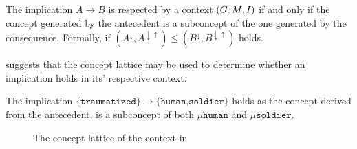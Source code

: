 \begin{proposition}
	\label{proposition:implication-concepts}

	The implication $A \rightarrow B$ is respected by a context $(G,M,\mathrel{I})$ if and only if the concept generated by the
	antecedent is a subconcept of the one generated by the consequence. Formally, if
	$(A^{\downarrow}, A^{\downarrow \uparrow}) \leq (B^{\downarrow}, B^{\downarrow \uparrow})$ holds.
\end{proposition}

 suggests that the concept lattice may be used to determine whether an implication
holds in its' respective context.

\begin{example}
	The implication $\{\texttt{traumatized}\}\rightarrow \{\texttt{human,soldier}\}$ holds as the concept derived from the
	antecedent, is a subconcept of both $\mu \texttt{human}$ and $\mu \texttt{soldier}$.

	\begin{figure}[H]
		\centering
		{\unitlength 1.75mm

		\begin{diagram}{40}{50} %

		 

		 

		 

		 

		  

		 

		 

		  


		  

		   

		 

		     \end{diagram} }
		\caption{The concept lattice of the context in }
	\end{figure}
\end{example}

